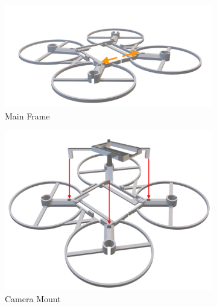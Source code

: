 \begin{figure}[H]
  \centering
  \begin{subfigure}[b]{0.48\linewidth}
    \centering
    \includegraphics[width=\linewidth]{img/manual/assemb1.png}
    \caption{Main Frame}
  \end{subfigure}
  \hfill
  \begin{subfigure}[b]{0.48\linewidth}
    \centering
    \includegraphics[width=\linewidth]{img/assembly-6.png}
    \caption{Camera Mount}
  \end{subfigure}
  \begin{subfigure}[b]{0.44\linewidth}
    \centering

\end{subfigure}
\end{figure}

